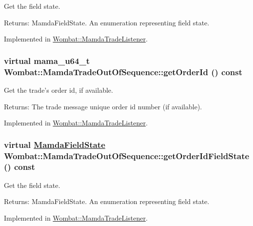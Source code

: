 Get the field state. 

\begin{Desc}
\item[Returns:]Mamda\-Field\-State. An enumeration representing field state. \end{Desc}


Implemented in \hyperlink{classWombat_1_1MamdaTradeListener_f8e874c8dc039fb83f1e9f4a8bdcbc6f}{Wombat::Mamda\-Trade\-Listener}.\hypertarget{classWombat_1_1MamdaTradeOutOfSequence_2dd8d7a5f09caeae16110a319d6f255c}{
\subsubsection[getOrderId]{\setlength{\rightskip}{0pt plus 5cm}virtual mama\_\-u64\_\-t Wombat::Mamda\-Trade\-Out\-Of\-Sequence::get\-Order\-Id () const}}
\label{classWombat_1_1MamdaTradeOutOfSequence_2dd8d7a5f09caeae16110a319d6f255c}


Get the trade's order id, if available. 

\begin{Desc}
\item[Returns:]The trade message unique order id number (if available). \end{Desc}


Implemented in \hyperlink{classWombat_1_1MamdaTradeListener_46c9913f3bc9f7e31f07afa76eaed7ff}{Wombat::Mamda\-Trade\-Listener}.\hypertarget{classWombat_1_1MamdaTradeOutOfSequence_76c6f61e99d00abf4d51b943606b2517}{
\subsubsection[getOrderIdFieldState]{\setlength{\rightskip}{0pt plus 5cm}virtual \hyperlink{namespaceWombat_93aac974f2ab713554fd12a1fa3b7d2a}{Mamda\-Field\-State} Wombat::Mamda\-Trade\-Out\-Of\-Sequence::get\-Order\-Id\-Field\-State () const}}
\label{classWombat_1_1MamdaTradeOutOfSequence_76c6f61e99d00abf4d51b943606b2517}


Get the field state. 

\begin{Desc}
\item[Returns:]Mamda\-Field\-State. An enumeration representing field state. \end{Desc}


Implemented in \hyperlink{classWombat_1_1MamdaTradeListener_f0f77145439c12c8bae3640307b50401}{Wombat::Mamda\-Trade\-Listener}.